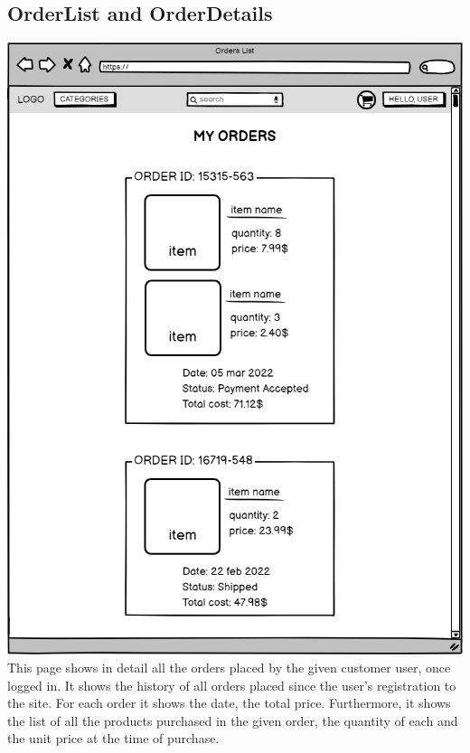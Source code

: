 \subsection{OrderList and OrderDetails}
    \includegraphics[width=\textwidth,height=\textheight,keepaspectratio]{mockups/ordersPageMockup.png}
\\
This page shows in detail all the orders placed by the given customer user, once logged in. It shows the history of all orders placed since the user's registration to the site. For each order it shows the date, the total price.
Furthermore, it shows the list of all the products purchased in the given order, the quantity of each and the unit price at the time of purchase.
